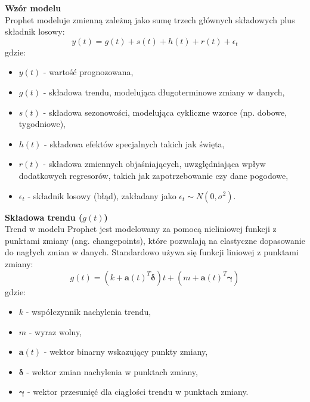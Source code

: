 \textbf{Wzór modelu} \\
Prophet modeluje zmienną zależną jako sumę trzech głównych składowych plus składnik losowy:
\begin{equation}
y(t) = g(t) + s(t) + h(t) + r(t) + \epsilon_t
\end{equation}
gdzie:
\begin{itemize}
    \item \( y(t) \) - wartość prognozowana,
    \item \( g(t) \) - składowa trendu, modelująca długoterminowe zmiany w danych,
    \item \( s(t) \) - składowa sezonowości, modelująca cykliczne wzorce (np. dobowe, tygodniowe),
    \item \( h(t) \) - składowa efektów specjalnych takich jak święta,
    \item \( r(t) \) - składowa zmiennych objaśniających, uwzględniająca wpływ dodatkowych regresorów, takich jak zapotrzebowanie czy dane pogodowe,
    \item \( \epsilon_t \) - składnik losowy (błąd), zakładany jako \( \epsilon_t \sim N(0, \sigma^2) \).
\end{itemize}

\textbf{Składowa trendu (\( g(t) \))} \\
Trend w modelu Prophet jest modelowany za pomocą nieliniowej funkcji z punktami zmiany (ang. changepoints), które pozwalają na elastyczne dopasowanie do nagłych zmian w danych. Standardowo używa się funkcji liniowej z punktami zmiany:
\begin{equation}
g(t) = (k + \mathbf{a}(t)^T \boldsymbol{\delta}) t + (m + \mathbf{a}(t)^T \boldsymbol{\gamma})
\end{equation}
gdzie:
\begin{itemize}
    \item \( k \) - współczynnik nachylenia trendu,
    \item \( m \) - wyraz wolny,
    \item \( \mathbf{a}(t) \) - wektor binarny wskazujący punkty zmiany,
    \item \( \boldsymbol{\delta} \) - wektor zmian nachylenia w punktach zmiany,
    \item \( \boldsymbol{\gamma} \) - wektor przesunięć dla ciągłości trendu w punktach zmiany.
\end{itemize}

